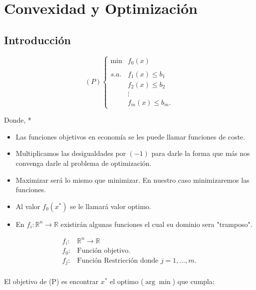\chapter{Convexidad y Optimización}

\begin{paracol}{2}
\section{Introducción}

\begin{tcolorbox}[colback=black!1!white,colframe=white!90!black]
$$
(P)
\left\{
\begin{array}{rl}
    \min & f_0(x)\\\\
    s.a. & f_1(x) \leq b_1\\
	 &f_2(x) \leq b_2\\
	 & \vdots\\
	 & f_m(x) \leq b_m.
\end{array}
\right.
$$
\end{tcolorbox}

Donde,
\switchcolumn[1]*{\noindent \scriptsize
    \begin{itemize}
	\item Las funciones objetivos en economía se les puede llamar funciones de coste.
	\item Multiplicamos las desigualdades por $(-1)$ para darle la forma que más nos convenga darle al problema de optimización.
	\item Maximizar será lo mismo que minimizar. En nuestro caso minimizaremos las funciones. 
	\item Al valor $f_0(x^*)$ se le llamará valor optimo.
	\item En $f_i:  \mathbb{R}^n \rightarrow \mathbb{R}$ existirán algunas funciones el cual su dominio sera "tramposo".
    \end{itemize}
}

\switchcolumn[0]
$$
\begin{array}{rl}
    f_i: & \mathbb{R}^n \rightarrow \mathbb{R}\\
    f_0 : & \mbox{Función objetivo.}\\
    f_j : & \mbox{Función Restricción donde }j=1,\ldots,m.\\
\end{array}
$$

El objetivo de (P) es encontrar $x^*$ el optimo ($\arg\min$) que cumpla:


\end{paracol}
